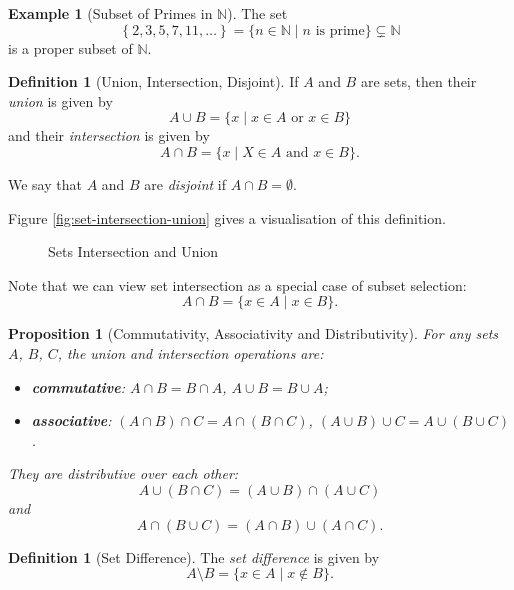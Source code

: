 \documentclass{article}
\newtheorem{proposition}[theorem]{Proposition}
\theoremstyle{definition}
\newtheorem{definition}[theorem]{Definition}
\newtheorem{example}[theorem]{Example}
\theoremstyle{remark}
\newcommand{\pqty}[1]{\left(#1\right)}
\newcommand{\Bqty}[1]{\left\{#1\right\}}
\newcommand{\set}[2]{\{#1\mid #2\}}
\newcommand{\NN}{\mathbb{N}}
\begin{document}
\begin{example}[Subset of Primes in \(\NN\)]
    The set
    \[
        \Bqty{2, 3, 5, 7, 11, \ldots} = \set{n \in \NN}{n \text{ is prime}} \subsetneq \NN
    \]
    is a proper subset of \(\NN\).
\end{example}

\begin{definition}[Union, Intersection, Disjoint]
    If \(A\) and \(B\) are sets, then their \emph{union} is given by
    \[
        A \cup B = \set{x}{x \in A \text{ or } x \in B}
    \]
    and their \emph{intersection} is given by
    \[
        A \cap B = \set{x}{X \in A \text{ and } x \in B}.
    \]

    We say that \(A\) and \(B\) are \emph{disjoint} if \(A \cap B = \emptyset\).
\end{definition}

Figure \autoref{fig:set-intersection-union} gives a visualisation of this definition.

\begin{figure}[ht!]
    \centering
    \caption{Sets Intersection and Union}
    \label{fig:set-intersection-union}
\end{figure}

Note that we can view set intersection as a special case of subset selection:
\[
    A \cap B = \set{x \in A}{x \in B}.
\]

\begin{proposition}[Commutativity, Associativity and Distributivity]
    For any sets \(A\), \(B\), \(C\), the union and intersection operations are:
    \begin{itemize}
        \item \textbf{commutative}: \(A \cap B = B \cap A\), \(A \cup B = B \cup A\);
        \item \textbf{associative}: \(\pqty{A \cap B} \cap C = A \cap \pqty{B \cap C}\), \(\pqty{A \cup B} \cup C = A \cup \pqty{B \cup C}\).
    \end{itemize}

    They are distributive over each other:
    \[
        A \cup \pqty{B \cap C} = \pqty{A \cup B} \cap \pqty{A \cup C}
    \]
    and
    \[
        A \cap \pqty{B \cup C} = \pqty{A \cap B} \cup \pqty{A \cap C}.
    \]
\end{proposition}

\begin{definition}[Set Difference]
    The \emph{set difference} is given by
    \[
        A \setminus B = \set{x \in A}{x \notin B}.
    \]
\end{definition}
\end{document}
